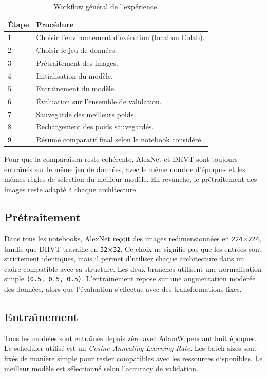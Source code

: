 \documentclass[11pt,a4paper]{article}
\begin{document}
\begin{table}[H]
\centering
\begin{tabular}{p{1.5cm}p{11.5cm}}
\toprule
\'Etape & Proc\'edure \\
\midrule
1 & Choisir l'environnement d'ex\'ecution (local ou Colab). \\
2 & Choisir le jeu de donn\'ees. \\
3 & Pr\'etraitement des images. \\
4 & Initialisation du mod\`ele. \\
5 & Entra\^\i nement du mod\`ele. \\
6 & \'Evaluation sur l'ensemble de validation. \\
7 & Sauvegarde des meilleurs poids. \\
8 & Rechargement des poids sauvegard\'es. \\
9 & R\'esum\'e comparatif final selon le notebook consid\'er\'e. \\
\bottomrule
\end{tabular}
\caption{Workflow g\'en\'eral de l'exp\'erience.}
\label{tab:workflow}
\end{table}

Pour que la comparaison reste coh\'erente, AlexNet et DHVT sont toujours entra\^\i n\'es sur le m\^eme jeu de donn\'ees, avec le m\^eme nombre d'\'epoques et les m\^emes r\`egles de s\'election du meilleur mod\`ele. En revanche, le pr\'etraitement des images reste adapt\'e \`a chaque architecture.

\subsection{Pr\'etraitement}
Dans tous les notebooks, AlexNet re\c coit des images redimensionn\'ees en \texttt{224}$\times$\texttt{224}, tandis que DHVT travaille en \texttt{32}$\times$\texttt{32}. Ce choix ne signifie pas que les entr\'ees sont strictement identiques, mais il permet d'utiliser chaque architecture dans un cadre compatible avec sa structure. Les deux branches utilisent une normalisation simple \texttt{(0.5, 0.5, 0.5)}. L'entra\^\i nement repose sur une augmentation mod\'er\'ee des donn\'ees, alors que l'\'evaluation s'effectue avec des transformations fixes.

\subsection{Entra\^\i nement}
Tous les mod\`eles sont entra\^\i n\'es depuis z\'ero avec AdamW pendant huit \'epoques. Le scheduler utilis\'e est un \textit{Cosine Annealing Learning Rate}. Les batch sizes sont fix\'es de mani\`ere simple pour rester compatibles avec les ressources disponibles. Le meilleur mod\`ele est s\'electionn\'e selon l'accuracy de validation.
\end{document}
